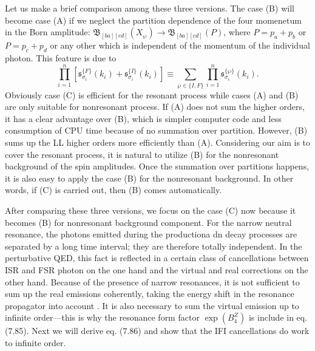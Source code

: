 Let us make a brief comparison among these three versions. The case (B) will become case (A) if we neglect the partition dependence of the four momenetum in the Born amplitude: $\mathfrak{B}_{[ba][cd]}(X_\wp)\to\mathfrak{B}_{[ba][cd]}(P)$, where $P=p_a+p_b$ or $P=p_c+p_d$ or any other which is independent of the momentum of the individual photon. This feature is due to
\begin{equation}
\prod_{i=1}^{n}[\mathfrak{s}^{\{F\}}_{\sigma_i}(k_i)+\mathfrak{s}^{\{I\}}_{\sigma_i}(k_i)]\equiv\sum_{\wp\in\{I,F\}}\prod_{i=1}^n\mathfrak{s}^{\{\wp\}}_{\sigma_i}(k_i).
\end{equation}
Obviously case (C) is efficient for the resonant process while cases (A) and (B) are only suitable for nonresonant process. If (A) does not sum the higher orders, it has a clear advantage over (B), which is simpler computer code and less consumption of CPU time because of no summation over partition. However, (B) sums up the LL higher orders more efficiently than (A). Considering our aim is to cover the resonant process, it is natural to utilize (B) for the nonresonant background of the spin amplitudes. Once the summation over partitions happens, it is also easy to apply the case (B) for the nonresonant background. In other words, if (C) is carried out, then (B) comes automatically. 

After comparing these three versions, we focus on the case (C) now because it becomes (B) for nonresonant background component.
For the narrow neutral resonance, the photons emitted during the productiona dn decay processes are separated by a long time interval; they are therefore totally independent. In the perturbative QED, this fact is reflected in a certain class of cancellations between ISR and FSR photon on the one hand and the virtual and real corrections on the other hand. Because of the presence of narrow resonances, it is not sufficient to sum up the real emissions coherently, taking the energy shift in the resonance propagator into account \cite{Greco1,Greco2}. It is also necessary to sum the virtual emission up to infinite order---this is why the resonance form factor $\exp(B^Z_4)$ is include in eq. (7.85). Next we will derive eq. (7.86) and show that the IFI cancellations do work to infinite order.

